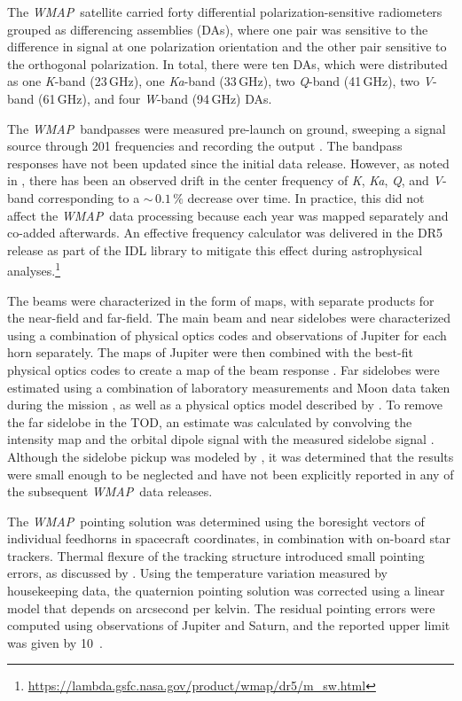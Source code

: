 \documentclass[twocolumn]{../../common/aa}
\def\WMAP{\emph{WMAP}}
\newcommand{\K}[0]{\textit K}
\newcommand{\Ka}[0]{\textit{Ka}}
\newcommand{\Q}[0]{\textit Q}
\newcommand{\V}[0]{\textit V}
\newcommand{\W}[0]{\textit W}
\begin{document}
The \WMAP\ satellite carried forty differential polarization-sensitive
radiometers grouped as differencing assemblies (DAs), where one pair
was sensitive to the difference in signal at one polarization
orientation and the other pair sensitive to the orthogonal
polarization. In total, there were ten DAs, which were distributed as
one \K-band (23\,GHz), one \Ka-band (33\,GHz), two \Q-band (41\,GHz),
two \V-band (61\,GHz), and four \W-band (94\,GHz) DAs.

The \WMAP\ bandpasses were measured pre-launch on ground, sweeping a signal source through 201 frequencies and recording the output \citep{jarosik2003:MAP}. The bandpass responses have not been updated since the initial data release. However, as noted in \citet{bennett2012}, there has been an observed drift in the center frequency of \K, \Ka, \Q, and \V-band corresponding to a $\sim$$\,0.1\,\%$ decrease over time. In practice, this did not affect the \WMAP\ data processing because each year was mapped separately and co-added afterwards. An effective frequency calculator was delivered in the DR5 release as part of the IDL library to mitigate this effect during astrophysical analyses.\footnote{\url{https://lambda.gsfc.nasa.gov/product/wmap/dr5/m_sw.html}}

The beams were characterized in the form of maps, with separate products for the near-field and far-field. The main beam and near sidelobes were characterized using a combination of physical optics codes and observations of Jupiter for each horn separately. The maps of Jupiter were then combined with the best-fit physical optics codes to create a map of the beam response \citep{hill2009,weiland2010,bennett2012}.
Far sidelobes were estimated using a combination of laboratory measurements and Moon data taken during the mission \citep{barnes2003}, as well as a physical optics model described by \citet{hinshaw2009}. To remove the far sidelobe  in the TOD, an estimate was calculated by convolving the intensity map and the orbital dipole signal with the measured sidelobe signal \citep{jarosik2007}. Although the sidelobe pickup was modeled by \citet{barnes2003}, it was determined that the results were small enough to be neglected and have not been explicitly reported in any of the subsequent \WMAP\ data releases.

The \WMAP\ pointing solution was determined using the boresight vectors of individual feedhorns in spacecraft coordinates, in combination with on-board star trackers. Thermal flexure of the tracking structure introduced small pointing errors, as discussed by \citet{jarosik2007}. Using the temperature variation measured by housekeeping data, the quaternion pointing solution was corrected using a linear model that depends on arcsecond per kelvin. The residual pointing errors were computed using observations of Jupiter and Saturn, and the reported upper limit was given by 10\arcsec\ \citep{bennett2012,wmapexsupp}.
\end{document}
